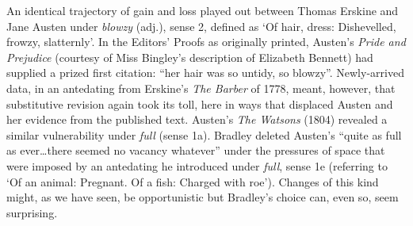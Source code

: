 \documentclass[output=paper,colorlinks,citecolor=brown,arabicfont,chinesefont]{langscibook}
\begin{document}
An identical trajectory of gain and loss played out between Thomas Erskine and Jane Austen under \emph{blowzy} (adj.), sense 2, defined as ‘Of hair, dress: Dishevelled, frowzy, slatternly’. In the Editors’ Proofs as originally printed, Austen’s \emph{Pride and Prejudice} (courtesy of Miss Bingley’s description of Elizabeth Bennett) had supplied a prized first citation: “her hair was so untidy, so blowzy”. Newly-arrived data, in an antedating from Erskine’s \emph{The Barber} of 1778, meant, however, that substitutive revision again took its toll, here in ways that displaced Austen and her evidence from the published text. Austen’s \emph{The Watsons} (1804) revealed a similar vulnerability under \emph{full} (sense 1a). Bradley deleted  Austen’s “quite as full as ever…there seemed no vacancy whatever” under the pressures of space that were imposed by an antedating he introduced under \emph{full}, sense 1e (referring to ‘Of an animal: Pregnant. Of a fish: Charged with roe’). Changes of this kind might, as we have seen, be opportunistic but Bradley’s choice can, even so, seem surprising.
\end{document}
